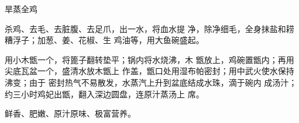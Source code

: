 \begin{recipe}{旱蒸全鸡}

\ingredients


\cooking

\step 	杀鸡、去毛、去脏腹、去足爪，出一水，将血水提 净，除净细毛，全身抹盐和耢糟浮子；加葱、姜、花椒、生 鸡油等，用大鱼碗盛起。

\step 	用小木甑一个，将篦子翻转垫平；锅内将水烧沸，木 甑放上，鸡碗置甑内；再用尖底瓦盆一个，盛清水放木甑上 作盖，甑口处用湿布帕密封；用中武火使水保持沸变；由于 密封热气不易散发，水蒸汽上升到盆底结成水珠，滴于碗内 成汤汁；约三小时鸡妃出甑，翻入深边圆盘，连原汁蒸汤上 席。

\notes

鲜香、肥嫩、原汁原味、极富营养。

\end{recipe}

